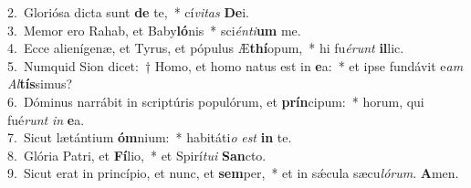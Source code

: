 {2.~}Gloriósa dicta sunt \textbf{de} te,~* cí\textit{vi}\textit{tas} \textbf{De}i.\\
{3.~}Memor ero Rahab, et Baby\textbf{ló}nis~* sci\textit{én}\textit{ti}\textbf{um} me.\\
{4.~}Ecce alienígenæ, et Tyrus, et pópulus Æ\textbf{thí}opum,~* hi fu\textit{é}\textit{runt} \textbf{il}lic.\\
{5.~}Numquid Sion dicet:~† Homo, et homo natus est in \textbf{e}a:~* et ipse fundávit e\textit{am} \textit{Al}\textbf{tís}simus?\\
{6.~}Dóminus narrábit in scriptúris populórum, et \textbf{prín}cipum:~* horum, qui fué\textit{runt} \textit{in} \textbf{e}a.\\
{7.~}Sicut lætántium \textbf{óm}nium:~* habitáti\textit{o} \textit{est} \textbf{in} te.\\
{8.~}Glória Patri, et \textbf{Fí}lio,~* et Spirí\textit{tu}\textit{i} \textbf{San}cto.\\
{9.~}Sicut erat in princípio, et nunc, et \textbf{sem}per,~* et in sǽcula sæcu\textit{ló}\textit{rum}. \textbf{A}men.\\
